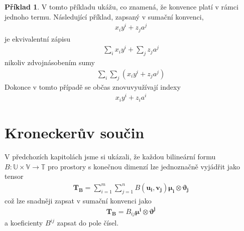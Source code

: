 \documentclass[a5paper,12pt]{amsbook}
\theoremstyle{definition}
\newtheorem{example}{Příklad}[chapter]
\newcommand{\myvec}[1]{\bm{#1}}
\newcommand{\myspace}[1]{\mathbb{#1}}
\begin{document}
\begin{example}
V tomto příkladu ukážu, co znamená, že konvence platí v rámci jednoho termu. Následující příklad,
zapsaný v sumační konvenci,
\begin{equation*}
\begin{split}
x_i y^i + z_j a^j
\end{split}
\end{equation*}
je ekvivalentní zápisu
\begin{equation*}
\begin{split}
\sum_{i} x_i y^i + \sum_{j} z_j a^j
\end{split}
\end{equation*}
nikoliv zdvojnásobením sumy
\begin{equation*}
\begin{split}
\sum_{i}\sum_{j}\left(x_i y^i +  z_j a^j\right)
\end{split}
\end{equation*}
Dokonce v tomto případě se občas znovuvyužívají indexy
\begin{equation*}
\begin{split}
x_i y^i + z_i a^i
\end{split}
\end{equation*}
\end{example}

\section{Kroneckerův součin}

\noindent
V předchozích kapitolách jsme si ukázali, že každou bilineární formu
$B:\myspace{U}\times\myspace{V}\rightarrow\myspace{T}$ pro prostory
s konečnou dimenzí lze jednoznačně vyjádřit jako tensor
\begin{equation*}
\begin{split}
\myvec{T_B} 
= \sum_{i=1}^{m}\sum_{j=1}^{n}B(\myvec{u_i}, \myvec{v_j})\myvec{\mu_i}\otimes\myvec{\vartheta_j}
\end{split}
\end{equation*}
což lze snadněji zapsat v sumační konvenci jako
\begin{equation*}
\begin{split}
\myvec{T_B} = B_{ij}\myvec{\mu^i}\otimes\myvec{\vartheta^j}
\end{split}
\end{equation*}
a koeficienty $B^{ij}$ zapsat do pole čísel.
\end{document}
